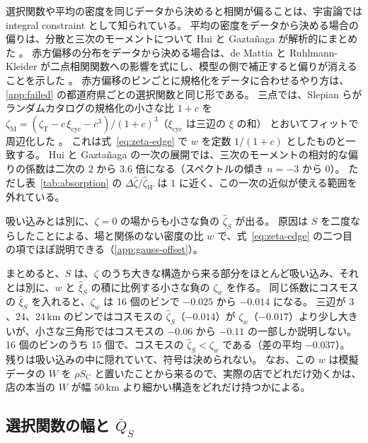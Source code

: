 \documentclass[a4paper,11pt]{ltjsarticle}
\begin{document}
選択関数や平均の密度を同じデータから決めると相関が偏ることは、宇宙論では integral constraint として知られている。
平均の密度をデータから決める場合の偏りは、分散と三次のモーメントについて Hui と Gaztañaga が解析的にまとめた \cite{HuiGaztanaga1999}。
赤方偏移の分布をデータから決める場合は、de Mattia と Ruhlmann-Kleider が二点相関関数への影響を式にし、模型の側で補正すると偏りが消えることを示した \cite{DeMattia2019}。
赤方偏移のビンごとに規格化をデータに合わせるやり方は、\ref{app:failed} の都道府県ごとの選択関数と同じ形である。
三点では、Slepian らがランダムカタログの規格化の小さな比 $1 + c$ を
$\zeta_{\mathrm{M}} = (\zeta_{\mathrm{T}} - c\,\xi_{\mathrm{cyc}} - c^3)/(1 + c)^3$（$\xi_{\mathrm{cyc}}$ は三辺の $\xi$ の和）
とおいてフィットで周辺化した \cite{Slepian2017}。
これは式~\eqref{eq:zeta-edge} で $w$ を定数 $1/(1 + c)$ としたものと一致する。
Hui と Gaztañaga の一次の展開では、三次のモーメントの相対的な偏りの係数は二次の $2$ から $3.6$ 倍になる（スペクトルの傾き $n = -3$ から $0$）。
ただし表~\ref{tab:absorption} の $\Delta\hat\zeta/\hat\zeta_W$ は $1$ に近く、この一次の近似が使える範囲を外れている。

吸い込みとは別に、$\zeta = 0$ の場からも小さな負の $\hat\zeta_S$ が出る。
原因は $S$ を二度ならしたことによる、場と関係のない密度の比 $w$ で、式~\eqref{eq:zeta-edge} の二つ目の項でほぼ説明できる（\ref{app:gauss-offset}）。

まとめると、$S$ は、$\zeta$ のうち大きな構造から来る部分をほとんど吸い込み、それとは別に、$w$ と $\hat\xi_S$ の積に比例する小さな負の $\zeta_w$ を作る。
同じ係数にコスモスの $\hat\xi_S$ を入れると、$\zeta_w$ は 16 個のビンで $-0.025$ から $-0.014$ になる。
三辺が $3$、$24$、$24\,\mathrm{km}$ のビンではコスモスの $\hat\zeta_S$（$-0.014$）が $\zeta_w$（$-0.017$）より少し大きいが、小さな三角形ではコスモスの $-0.06$ から $-0.11$ の一部しか説明しない。
16 個のビンのうち 15 個で、コスモスの $\hat\zeta_S < \zeta_w$ である（差の平均 $-0.037$）。
残りは吸い込みの中に隠れていて、符号は決められない。
なお、この $w$ は模擬データの $W$ を $\rho S_{\mathrm{C}}$ と置いたことから来るので、実際の店でどれだけ効くかは、店の本当の $W$ が幅 $50\,\mathrm{km}$ より細かい構造をどれだけ持つかによる。

\subsection{選択関数の幅と $\bar Q_S$}
\label{sec:vary-r}
\end{document}
